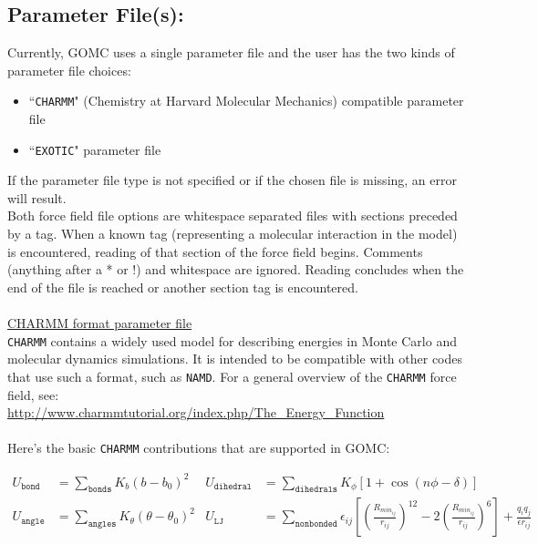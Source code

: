 \subsection{Parameter File(s):}
Currently, GOMC uses a single parameter file and the user has the two kinds of parameter file choices:
\begin{itemize}
\item ``\texttt{CHARMM}" (Chemistry at Harvard Molecular Mechanics) compatible parameter file
\item ``\texttt{EXOTIC}" parameter file
\end{itemize}
If the parameter file type is not specified or if the chosen file is missing, an error will result.\\
Both force field file options are whitespace separated files with sections preceded by a tag. When a known tag (representing a molecular interaction in the model) is encountered, reading of that section of the force field begins.  Comments (anything after a * or !) and whitespace are ignored. Reading concludes when the end of the file is reached or another section tag is encountered.\\\\
\underline{CHARMM format parameter file}\\
\texttt{CHARMM} contains a widely used model for describing energies in Monte Carlo and molecular dynamics simulations. It is intended to be compatible with other codes that use such a format, such as \texttt{NAMD}.
For a general overview of the \texttt{CHARMM} force field, see:\\
\url{http://www.charmmtutorial.org/index.php/The_Energy_Function}\\\\
Here's the basic \texttt{CHARMM} contributions that are supported in GOMC:

\begin{align*}
U_{\texttt{bond}}&=\sum_{\texttt{bonds}} K_b(b-b_0)^2 & U_{\texttt{dihedral}}&=\sum_{\texttt{dihedrals}} K_{\phi} [1+\cos(n\phi - \delta)]\\
U_{\texttt{angle}}&=\sum_{\texttt{angles}} K_{\theta}(\theta-\theta_0)^2 & U_{\texttt{LJ}} &=\sum_{\texttt{nonbonded}} \epsilon_{ij}\left[\left(\frac{R_{min_{ij}}}{r_{ij}}\right)^{12}-2\left(\frac{R_{min_{ij}}}{r_{ij}}\right)^6\right]+ \frac{q_i q_j}{\epsilon r_{ij}} \\
\end{align*}

